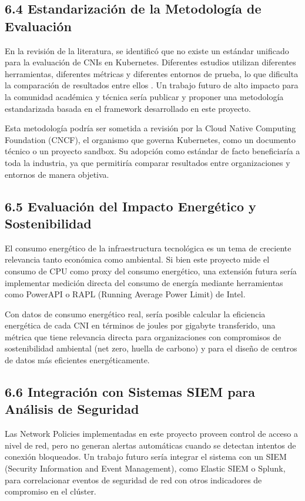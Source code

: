 \documentclass[journal]{IEEEtran}
\begin{document}
\subsection{6.4 Estandarización de la Metodología de Evaluación}

En la revisión de la literatura, se identificó que no existe un estándar unificado para la evaluación de CNIs en Kubernetes. Diferentes estudios utilizan diferentes herramientas, diferentes métricas y diferentes entornos de prueba, lo que dificulta la comparación de resultados entre ellos \cite{ref7,ref8}. Un trabajo futuro de alto impacto para la comunidad académica y técnica sería publicar y proponer una metodología estandarizada basada en el framework desarrollado en este proyecto.

Esta metodología podría ser sometida a revisión por la Cloud Native Computing Foundation (CNCF), el organismo que governa Kubernetes, como un documento técnico o un proyecto sandbox. Su adopción como estándar de facto beneficiaría a toda la industria, ya que permitiría comparar resultados entre organizaciones y entornos de manera objetiva.

\subsection{6.5 Evaluación del Impacto Energético y Sostenibilidad}

El consumo energético de la infraestructura tecnológica es un tema de creciente relevancia tanto económica como ambiental. Si bien este proyecto mide el consumo de CPU como proxy del consumo energético, una extensión futura sería implementar medición directa del consumo de energía mediante herramientas como PowerAPI o RAPL (Running Average Power Limit) de Intel.

Con datos de consumo energético real, sería posible calcular la eficiencia energética de cada CNI en términos de joules por gigabyte transferido, una métrica que tiene relevancia directa para organizaciones con compromisos de sostenibilidad ambiental (net zero, huella de carbono) y para el diseño de centros de datos más eficientes energéticamente.

\subsection{6.6 Integración con Sistemas SIEM para Análisis de Seguridad}

Las Network Policies implementadas en este proyecto proveen control de acceso a nivel de red, pero no generan alertas automáticas cuando se detectan intentos de conexión bloqueados. Un trabajo futuro sería integrar el sistema con un SIEM (Security Information and Event Management), como Elastic SIEM o Splunk, para correlacionar eventos de seguridad de red con otros indicadores de compromiso en el clúster.
\end{document}

